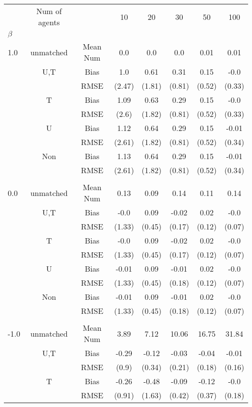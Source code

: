 \begin{tabular}{@{\extracolsep{5pt}}lc|cccccc}
\toprule 
 & Num of agents &  & 10 & 20 & 30 & 50 & 100 \\
$\beta$ &  &  &  &  &  &  &  \\
\midrule 
1.0 & unmatched & Mean Num & 0.0 & 0.0 & 0.0 & 0.01 & 0.01 \\
 & U,T & Bias & 1.0 & 0.61 & 0.31 & 0.15 & -0.0 \\
 &  & RMSE & (2.47) & (1.81) & (0.81) & (0.52) & (0.33) \\
 & T & Bias & 1.09 & 0.63 & 0.29 & 0.15 & -0.0 \\
 &  & RMSE & (2.6) & (1.82) & (0.81) & (0.52) & (0.33) \\
 & U & Bias & 1.12 & 0.64 & 0.29 & 0.15 & -0.01 \\
 &  & RMSE & (2.61) & (1.82) & (0.81) & (0.52) & (0.34) \\
 & Non & Bias & 1.13 & 0.64 & 0.29 & 0.15 & -0.01 \\
 &  & RMSE & (2.61) & (1.82) & (0.81) & (0.52) & (0.34) \\
 &  &  &  &  &  &  &  \\
0.0 & unmatched & Mean Num & 0.13 & 0.09 & 0.14 & 0.11 & 0.14 \\
 & U,T & Bias & -0.0 & 0.09 & -0.02 & 0.02 & -0.0 \\
 &  & RMSE & (1.33) & (0.45) & (0.17) & (0.12) & (0.07) \\
 & T & Bias & -0.0 & 0.09 & -0.02 & 0.02 & -0.0 \\
 &  & RMSE & (1.33) & (0.45) & (0.17) & (0.12) & (0.07) \\
 & U & Bias & -0.01 & 0.09 & -0.01 & 0.02 & -0.0 \\
 &  & RMSE & (1.33) & (0.45) & (0.18) & (0.12) & (0.07) \\
 & Non & Bias & -0.01 & 0.09 & -0.01 & 0.02 & -0.0 \\
 &  & RMSE & (1.33) & (0.45) & (0.18) & (0.12) & (0.07) \\
 &  &  &  &  &  &  &  \\
-1.0 & unmatched & Mean Num & 3.89 & 7.12 & 10.06 & 16.75 & 31.84 \\
 & U,T & Bias & -0.29 & -0.12 & -0.03 & -0.04 & -0.01 \\
 &  & RMSE & (0.9) & (0.34) & (0.21) & (0.18) & (0.16) \\
 & T & Bias & -0.26 & -0.48 & -0.09 & -0.12 & -0.0 \\
 &  & RMSE & (0.91) & (1.63) & (0.42) & (0.37) & (0.18) \\

\end{tabular}
